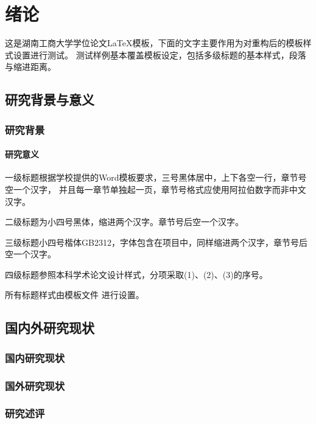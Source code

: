\chapter{绪论}

这是湖南工商大学学位论文\LaTeX{}模板，下面的文字主要作用为对重构后的模板样式设置进行测试。
测试样例基本覆盖模板设定，包括多级标题的基本样式，段落与缩进距离。

\section{研究背景与意义}

\subsection{研究背景}

\subsubsection{研究意义}

一级标题根据学校提供的Word模板要求，三号黑体居中，上下各空一行，章节号空一个汉字，
并且每一章节单独起一页，章节号格式应使用阿拉伯数字而非中文汉字。

二级标题为小四号黑体，缩进两个汉字。章节号后空一个汉字。

三级标题小四号楷体GB2312，字体包含在项目中，同样缩进两个汉字，章节号后空一个汉字。

四级标题参照本科学术论文设计样式，分项采取(1)、(2)、(3)的序号。

所有标题样式由模板文件  进行设置。

\section{国内外研究现状}

\subsection{国内研究现状}

\subsection{国外研究现状}

\subsection{研究述评}


